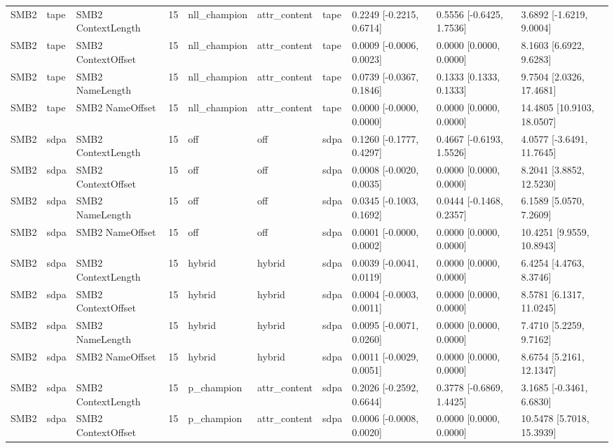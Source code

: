 \begin{tabular}{llllllllll}
SMB2 & tape & SMB2 ContextLength & 15 & nll\_champion & attr\_content & tape & 0.2249 [-0.2215, 0.6714] & 0.5556 [-0.6425, 1.7536] & 3.6892 [-1.6219, 9.0004] \\
SMB2 & tape & SMB2 ContextOffset & 15 & nll\_champion & attr\_content & tape & 0.0009 [-0.0006, 0.0023] & 0.0000 [0.0000, 0.0000] & 8.1603 [6.6922, 9.6283] \\
SMB2 & tape & SMB2 NameLength & 15 & nll\_champion & attr\_content & tape & 0.0739 [-0.0367, 0.1846] & 0.1333 [0.1333, 0.1333] & 9.7504 [2.0326, 17.4681] \\
SMB2 & tape & SMB2 NameOffset & 15 & nll\_champion & attr\_content & tape & 0.0000 [-0.0000, 0.0000] & 0.0000 [0.0000, 0.0000] & 14.4805 [10.9103, 18.0507] \\
SMB2 & sdpa & SMB2 ContextLength & 15 & off & off & sdpa & 0.1260 [-0.1777, 0.4297] & 0.4667 [-0.6193, 1.5526] & 4.0577 [-3.6491, 11.7645] \\
SMB2 & sdpa & SMB2 ContextOffset & 15 & off & off & sdpa & 0.0008 [-0.0020, 0.0035] & 0.0000 [0.0000, 0.0000] & 8.2041 [3.8852, 12.5230] \\
SMB2 & sdpa & SMB2 NameLength & 15 & off & off & sdpa & 0.0345 [-0.1003, 0.1692] & 0.0444 [-0.1468, 0.2357] & 6.1589 [5.0570, 7.2609] \\
SMB2 & sdpa & SMB2 NameOffset & 15 & off & off & sdpa & 0.0001 [-0.0000, 0.0002] & 0.0000 [0.0000, 0.0000] & 10.4251 [9.9559, 10.8943] \\
SMB2 & sdpa & SMB2 ContextLength & 15 & hybrid & hybrid & sdpa & 0.0039 [-0.0041, 0.0119] & 0.0000 [0.0000, 0.0000] & 6.4254 [4.4763, 8.3746] \\
SMB2 & sdpa & SMB2 ContextOffset & 15 & hybrid & hybrid & sdpa & 0.0004 [-0.0003, 0.0011] & 0.0000 [0.0000, 0.0000] & 8.5781 [6.1317, 11.0245] \\
SMB2 & sdpa & SMB2 NameLength & 15 & hybrid & hybrid & sdpa & 0.0095 [-0.0071, 0.0260] & 0.0000 [0.0000, 0.0000] & 7.4710 [5.2259, 9.7162] \\
SMB2 & sdpa & SMB2 NameOffset & 15 & hybrid & hybrid & sdpa & 0.0011 [-0.0029, 0.0051] & 0.0000 [0.0000, 0.0000] & 8.6754 [5.2161, 12.1347] \\
SMB2 & sdpa & SMB2 ContextLength & 15 & p\_champion & attr\_content & sdpa & 0.2026 [-0.2592, 0.6644] & 0.3778 [-0.6869, 1.4425] & 3.1685 [-0.3461, 6.6830] \\
SMB2 & sdpa & SMB2 ContextOffset & 15 & p\_champion & attr\_content & sdpa & 0.0006 [-0.0008, 0.0020] & 0.0000 [0.0000, 0.0000] & 10.5478 [5.7018, 15.3939] \\

\end{tabular}
